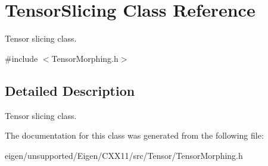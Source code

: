 \hypertarget{class_tensor_slicing}{}\section{Tensor\+Slicing Class Reference}
\label{class_tensor_slicing}


Tensor slicing class.  




{\ttfamily \#include $<$Tensor\+Morphing.\+h$>$}



\subsection{Detailed Description}
Tensor slicing class. 

The documentation for this class was generated from the following file\+:\begin{DoxyCompactItemize}
\item 
eigen/unsupported/\+Eigen/\+C\+X\+X11/src/\+Tensor/\+Tensor\+Morphing.\+h\end{DoxyCompactItemize}
